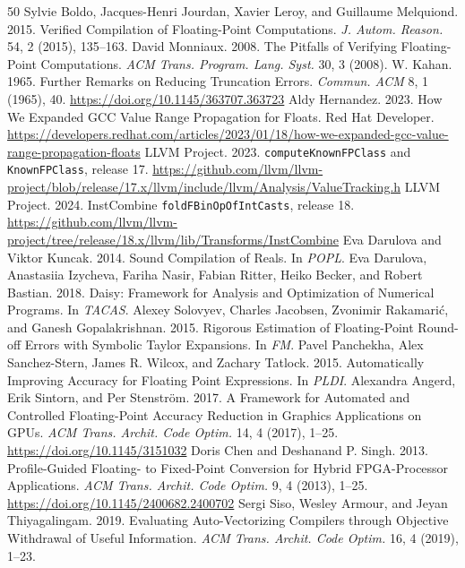 \documentclass[acmsmall,review,anonymous,nonacm]{acmart}
\begin{document}
\begin{thebibliography}{50}
 Sylvie Boldo, Jacques-Henri Jourdan, Xavier Leroy, and
Guillaume Melquiond. 2015. Verified Compilation of Floating-Point Computations.
\textit{J. Autom. Reason.} 54, 2 (2015), 135--163.
 David Monniaux. 2008. The Pitfalls of Verifying Floating-Point
Computations. \textit{ACM Trans. Program. Lang. Syst.} 30, 3 (2008).
 W. Kahan. 1965. Further Remarks on Reducing Truncation Errors.
\textit{Commun. ACM} 8, 1 (1965), 40. \url{https://doi.org/10.1145/363707.363723}
 Aldy Hernandez. 2023. How We Expanded GCC Value Range
Propagation for Floats. Red Hat Developer.
\url{https://developers.redhat.com/articles/2023/01/18/how-we-expanded-gcc-value-range-propagation-floats}
 LLVM Project. 2023. \texttt{computeKnownFPClass} and
\texttt{KnownFPClass}, release 17.
\url{https://github.com/llvm/llvm-project/blob/release/17.x/llvm/include/llvm/Analysis/ValueTracking.h}
 LLVM Project. 2024. InstCombine
\texttt{foldFBinOpOfIntCasts}, release 18.
\url{https://github.com/llvm/llvm-project/tree/release/18.x/llvm/lib/Transforms/InstCombine}
 Eva Darulova and Viktor Kuncak. 2014. Sound Compilation of Reals. In
\textit{POPL}.
 Eva Darulova, Anastasiia Izycheva, Fariha Nasir, Fabian Ritter,
Heiko Becker, and Robert Bastian. 2018. Daisy: Framework for Analysis and
Optimization of Numerical Programs. In \textit{TACAS}.
 Alexey Solovyev, Charles Jacobsen, Zvonimir Rakamari\'c, and
Ganesh Gopalakrishnan. 2015. Rigorous Estimation of Floating-Point Round-off Errors
with Symbolic Taylor Expansions. In \textit{FM}.
 Pavel Panchekha, Alex Sanchez-Stern, James R. Wilcox, and Zachary
Tatlock. 2015. Automatically Improving Accuracy for Floating Point Expressions. In
\textit{PLDI}.
 Alexandra Angerd, Erik Sintorn, and Per Stenstr\"om. 2017. A
Framework for Automated and Controlled Floating-Point Accuracy Reduction in
Graphics Applications on GPUs. \textit{ACM Trans. Archit. Code Optim.} 14, 4
(2017), 1--25. \url{https://doi.org/10.1145/3151032}
 Doris Chen and Deshanand P. Singh. 2013. Profile-Guided
Floating- to Fixed-Point Conversion for Hybrid FPGA-Processor Applications.
\textit{ACM Trans. Archit. Code Optim.} 9, 4 (2013), 1--25.
\url{https://doi.org/10.1145/2400682.2400702}
 Sergi Siso, Wesley Armour, and Jeyan Thiyagalingam. 2019.
Evaluating Auto-Vectorizing Compilers through Objective Withdrawal of Useful
Information. \textit{ACM Trans. Archit. Code Optim.} 16, 4 (2019), 1--23.

\end{thebibliography}
\end{document}
